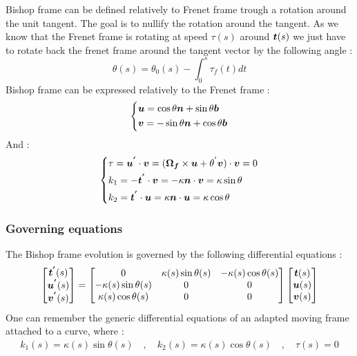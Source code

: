 Bishop frame can be defined relatively to Frenet frame trough a rotation around the unit tangent.
The goal is to nullify the rotation around the tangent. As we know that the Frenet frame is rotating at speed $\tau(s)$ around $\boldsymbol{t}(s)$ we just have to rotate back the frenet frame around the tangent vector by the following angle :
\begin{equation}
	\theta(s) = \theta_0(s) - \int_0^s \tau_f(t)dt
\end{equation}
Bishop frame can be expressed relatively to the Frenet frame :
\begin{equation}
	\left\{
	\begin{aligned}
		&\boldsymbol{u} = \cos \theta \boldsymbol{n} +  \sin \theta \boldsymbol{b}\\
		&\boldsymbol{v} = -\sin \theta \boldsymbol{n} +  \cos \theta \boldsymbol{b}
	\end{aligned}
	\right.
\end{equation}
And :
\begin{equation}
	\left\{
	\begin{aligned}
		&\tau =\boldsymbol{u^{'}} \cdot \boldsymbol{v} = (\boldsymbol{\Omega_f} \times \boldsymbol{u} + \theta^{'} \boldsymbol{v})\cdot  \boldsymbol{v} = 0\\
		&k_1 = -\boldsymbol{t^{'}} \cdot \boldsymbol{v} = -\kappa \boldsymbol{n} \cdot \boldsymbol{v} = \kappa \sin \theta \\
		&k_2 = \boldsymbol{t^{'}} \cdot \boldsymbol{u} = \kappa \boldsymbol{n} \cdot \boldsymbol{u} = \kappa \cos \theta
	\end{aligned}
	\right.
\end{equation}

\subsubsection{Governing equations}
The Bishop frame evolution is governed by the following differential equations :
\begin{equation}
	\begin{bmatrix}
		\boldsymbol{t^{'}}(s) \\
		\boldsymbol{u^{'}}(s) \\
		\boldsymbol{v^{'}}(s)
	\end{bmatrix}
	=
	\begin{bmatrix}
		0 & \kappa(s) \sin \theta(s) & -\kappa(s) \cos \theta(s) \\
		-\kappa(s) \sin \theta(s) & 0 & 0 \\
		\kappa(s) \cos \theta(s) & 0 & 0
	\end{bmatrix}
	\begin{bmatrix}
		\boldsymbol{t}(s) \\
		\boldsymbol{u}(s) \\
		\boldsymbol{v}(s)
	\end{bmatrix}
\label{eq:3_12}
\end{equation}
One can remember the generic differential equations of an adapted moving frame attached to a curve, where :
\begin{gather}
k_{1}(s) = \kappa(s) \sin \theta(s)
\quad,\quad
k_{2}(s) = \kappa(s) \cos \theta(s)
\quad,\quad
\tau(s) = 0
\end{gather}

